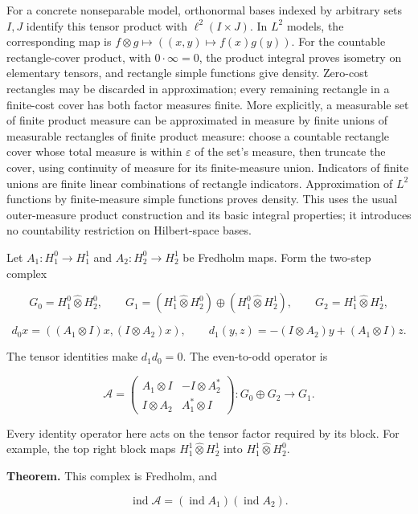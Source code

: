 \documentclass[
  11pt,
]{article}
\begin{document}
For a concrete nonseparable model, orthonormal bases indexed by
arbitrary sets \(I,J\) identify this tensor product with
\(\ell^2(I\times J)\). In \(L^2\) models, the corresponding map is
\(f\otimes g\mapsto((x,y)\mapsto f(x)g(y))\). For the countable
rectangle-cover product, with \(0\cdot\infty=0\), the product integral
proves isometry on elementary tensors, and rectangle simple functions
give density. Zero-cost rectangles may be discarded in approximation;
every remaining rectangle in a finite-cost cover has both factor
measures finite. More explicitly, a measurable set of finite product
measure can be approximated in measure by finite unions of measurable
rectangles of finite product measure: choose a countable rectangle cover
whose total measure is within \(\varepsilon\) of the set's measure, then
truncate the cover, using continuity of measure for its finite-measure
union. Indicators of finite unions are finite linear combinations of
rectangle indicators. Approximation of \(L^2\) functions by
finite-measure simple functions proves density. This uses the usual
outer-measure product construction and its basic integral properties; it
introduces no countability restriction on Hilbert-space bases.

Let \(A_1:H_1^0\to H_1^1\) and \(A_2:H_2^0\to H_2^1\) be Fredholm maps.
Form the two-step complex

\[
G_0=H_1^0\widehat\otimes H_2^0,\qquad
G_1=(H_1^1\widehat\otimes H_2^0)\oplus
    (H_1^0\widehat\otimes H_2^1),\qquad
G_2=H_1^1\widehat\otimes H_2^1,
\]

\[
d_0x=((A_1\otimes I)x,(I\otimes A_2)x),\qquad
d_1(y,z)=-(I\otimes A_2)y+(A_1\otimes I)z.                   \tag{T40}
\]

The tensor identities make \(d_1d_0=0\). The even-to-odd operator is

\[
\mathcal A=
\begin{pmatrix}
A_1\otimes I&-I\otimes A_2^*\\
I\otimes A_2&A_1^*\otimes I
\end{pmatrix}:G_0\oplus G_2\longrightarrow G_1.              \tag{T41}
\]

Every identity operator here acts on the tensor factor required by its
block. For example, the top right block maps
\(H_1^1\widehat\otimes H_2^1\) into \(H_1^1\widehat\otimes H_2^0\).

\textbf{Theorem.} This complex is Fredholm, and

\[
\operatorname{ind}\mathcal A
=(\operatorname{ind}A_1)(\operatorname{ind}A_2).              \tag{T42}
\]
\end{document}
